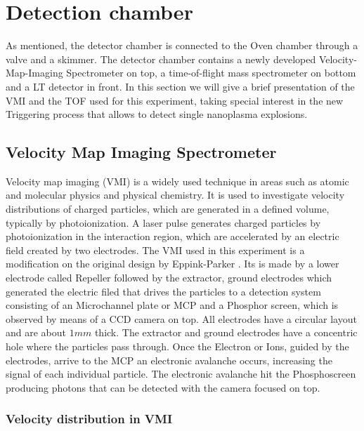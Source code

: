 \section{Detection chamber}

As mentioned, the detector chamber is connected to the Oven chamber through a valve and a skimmer. The detector chamber contains a newly developed Velocity-Map-Imaging
Spectrometer on top, a time-of-flight mass spectrometer on bottom and a LT detector in front. In this section we will give a brief presentation of the VMI and the TOF used for this experiment, taking special interest in the new Triggering process that allows to detect single nanoplasma explosions. 
 
 
\subsection{Velocity Map Imaging Spectrometer}

Velocity map imaging (VMI) is a widely used technique in areas such as atomic and molecular physics and physical chemistry. It is used to investigate velocity distributions of charged particles, which are generated in a defined volume, typically by photoionization.
A laser pulse generates charged particles by photoionization in the interaction region, which are accelerated by an electric field created by two electrodes.
The VMI used in this experiment is a modification on the original design by Eppink-Parker \cite{eppink_velocity_1997}. Its is made by a lower  electrode called Repeller followed by the extractor, ground electrodes which generated the electric filed that drives the particles to a detection system consisting of an Microchannel plate or MCP  and a Phosphor screen, which is observed by means of a CCD camera on top.  All electrodes have a circular layout and are about $1 mm$ thick.  The extractor and ground electrodes have a concentric hole where the particles pass through.
Once the Electron or Ions, guided by the electrodes, arrive to the MCP an electronic avalanche occurs, increasing the signal of each individual particle. The electronic avalanche hit the Phosphoscreen producing photons that can be detected with the camera focused on top.

\subsubsection{ Velocity distribution in VMI}

